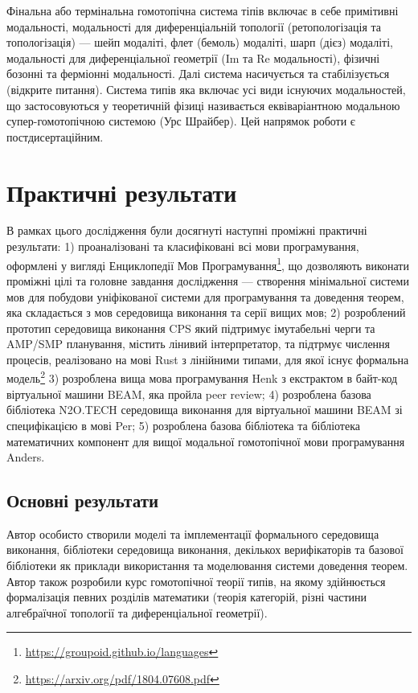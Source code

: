 Фінальна або термінальна гомотопічна система тіпів включає в себе примітивні модальності,
модальності для диференціальній топології (ретопологізація та топологізація) — шейп модаліті,
флет (бемоль) модаліті, шарп (дієз) модаліті, модальності для диференціальної
геометрії (Im та Re модальності), фізичні бозонні та ферміонні модальності. Далі система
насичується та стабілізується (відкрите питання). Система типів яка включає
усі види існуючих модальностей, що застосовуються у теоретичній фізиці називається еквіваріантною
модальною супер-гомотопічною системою (Урс Шрайбер). Цей напрямок роботи є постдисертаційним.

\section{Практичні результати}
В рамках цього дослідження були досягнуті наступні проміжні практичні результати:
1) проаналізовані та класифіковані всі мови програмування, оформлені у вигляді
   Енциклопедії Мов Програмування\footnote{\url{https://groupoid.github.io/languages}},
   що дозволяють виконати проміжні цілі та головне завдання дослідження --- створення
   мінімальної системи мов для побудови уніфікованої системи для програмування та доведення теорем,
   яка складається з мов середовища виконання та серії вищих мов;
2) розроблений прототип середовища виконання CPS який підтримує імутабельні черги
   та AMP/SMP планування, містить лінивий інтерпретатор, та підтрмує числення процесів,
   реалізовано на мові Rust з лінійними типами,
   для якої існує формальна модель\footnote{\url{https://arxiv.org/pdf/1804.07608.pdf}}
3) розроблена вища мова програмування Henk з екстрактом в байт-код віртуальної
   машини BEAM, яка пройла peer review;
4) розроблена базова бібліотека N2O.TECH середовища виконання для віртуальної
   машини BEAM зі специфікацією в мові Per;
5) розроблена базова бібліотека та бібліотека математичних компонент для вищої
   модальної гомотопічної мови програмування Anders.

\subsection{Основні результати}
Автор особисто створили моделі та імплементації формального середовища виконання,
бібліотеки середовища виконання, декількох верифікаторів та базової бібліотеки
як приклади використання та моделювання системи доведення теорем. Автор також
розробили курс гомотопічної теорії типів, на якому здійнюється формалізація
певних розділів математики (теорія категорій, різні частини алгебраїчної
топології та диференціальної геометрії).

